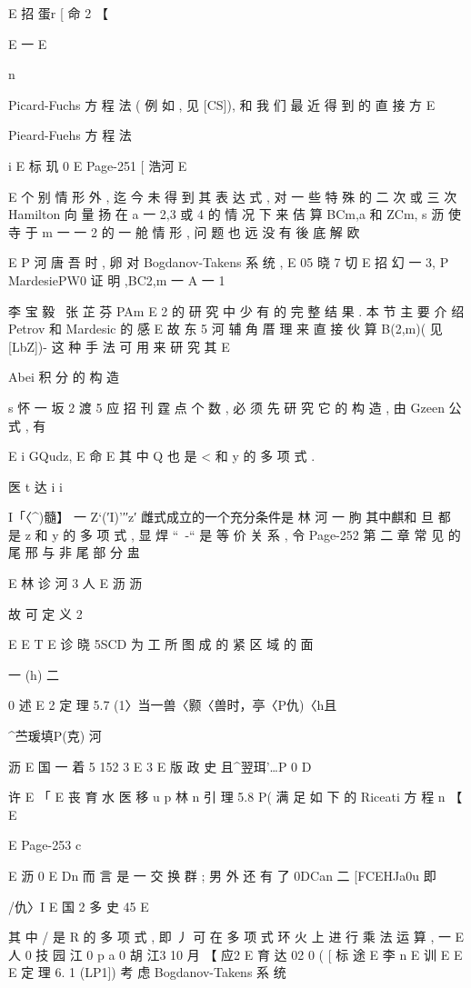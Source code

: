 {{{{{{{{{{{{{{{E 招 蛋r [ 命 2 【

E 一
E

n

Picard-Fuchs 方 程 法 ( 例 如 , 见 [CS]), 和 我 们 最 近 得 到 的 直 接 方
E

Pieard-Fuehs 方 程 法

i
E 标 玑 0
E
Page-251
[ 浩河 E

E
个 别 情 形 外 , 迄 今 未 得 到 其 表 达 式 , 对 一 些 特 殊 的 二 次 或 三 次
Hamilton 向 量 扬 在 a 一 2,3 或 4 的 情 况 下 来 佶 算 BCm,a 和 ZCm,
s 沥
使 寺 于 m 一 一 2 的 一 舱 情 形 , 问 题 也 远 没 有 後 底 解 欧

E P 河 唐 吾 时 , 卵 对 Bogdanov-Takens 系 统 ,
E 05 晓 7 切
E 招
幻 一 3, P MardesiePW0 证 明 ,BC2,m 一 A 一 1} 李 宝 毅 \ 张 芷 芬 PAm
E
2
的 研 究 中 少 有 的 完 整 结 果 . 本 节 主 要 介 绍 Petrov 和 Mardesic 的 感
E 故 东 5 河
辅 角 厝 理 来 直 接 伙 算 B(2,m)( 见 [LbZ])- 这 种 手 法 可 用 来 研 究 其
E

Abei 积 分 的 构 造

s 怀 一 坂 2 渡 5 应 招
刊 霆 点 个 数 , 必 须 先 研 究 它 的 构 造 , 由 Gzeen 公 式 , 有

E i GQudz,
E 命 E
其 中 Q 也 是 < 和 y 的 多 项 式 .

医 t 达 i
i

I「〈^)髓】 一 Z`(′I)'′′z′
雌式成立的一个充分条件是
林 河 一 朐
其中麒和 旦 都 是 z 和 y 的 多 项 式 , 显 焊 “~-“ 是 等 价 关 系 , 令
Page-252
第 二 章 常 见 的 尾 邢 与 非 尾 部 分 盅

E 林 诊 河 3 人
E 沥 沥

故 可 定 义
2

E
E
T
E 诊 晓 5SCD 为 工 所 图 成 的 紧 区 域 的 面

一 (h) 二

0 述
E 2
定 理 5.7 (1〉当一兽〈颢〈兽时，亭〈P仇)〈h且

^苎瑗填P(克) 河

沥 E 国 一 着 5
152 3 E 3 E 版 政 史 且^翌珥'…P 0
D

许
E 「
E 丧 育 水
医 移 u p 林 n
引 理 5.8 P( 满 足 如 下 的 Riceati 方 程
n 【
E

E
Page-253
c

E 沥 0
E
Dn
而 言 是 一 交 换 群 ; 男 外 还 有
了 0DCan 二 [FCEHJa0u
即

/仇〉I E 国 2 多 史
45 E

其 中 / 是 R 的 多 项 式 , 即 丿 可 在 多 项 式 环 火 上 进 行 乘 法 运 算 , 一
E 人 0 技 园 江
0 p a 0 胡 江3 10 月
【 应2 E 育 达 02
0 (
[ 标 途
E 李 n
E 训
E
E
E
定 理 6. 1 (LP1]) 考 虑 Bogdanov-Takens 系 统

}}}}}}}}}}}}}}
